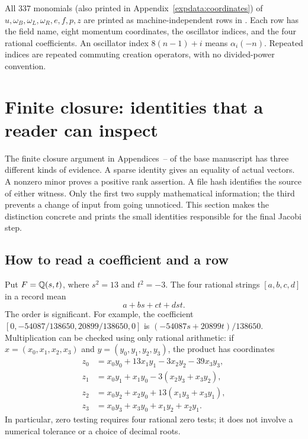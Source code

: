 All $337$ monomials (also printed in Appendix~\ref{expdata:coordinates}) of $u,\omega_B,\omega_L,\omega_R,e,f,p,z$ are
printed as machine-independent rows in
. Each row has
the field name, eight momentum coordinates, the oscillator indices,
and the four rational coefficients. An oscillator index $8(n-1)+i$
means $\alpha_i(-n)$. Repeated indices are repeated commuting creation
operators, with no divided-power convention.

\section{Finite closure: identities that a reader can inspect}
\label{sec:reader-finite}

The finite closure argument in Appendices~-- of the
base manuscript has three different kinds of
evidence.  A sparse identity gives an equality of actual vectors.  A
nonzero minor proves a positive rank assertion.  A file hash identifies
the source of either witness.  Only the first two supply mathematical
information; the third prevents a change of input from going unnoticed.
This section makes the distinction concrete and prints the small
identities responsible for the final Jacobi step.

\subsection{How to read a coefficient and a row}

Put $F=\mathbb Q(s,t)$, where $s^2=13$ and $t^2=-3$.  The four rational
strings $[a,b,c,d]$ in a record mean
\[
                  a+bs+ct+dst.
\]
The order is significant.  For example, the coefficient
$[0,-54087/138650,20899/138650,0]$ is
$(-54087s+20899t)/138650$.  Multiplication can be checked using
only rational arithmetic: if $x=(x_0,x_1,x_2,x_3)$ and
$y=(y_0,y_1,y_2,y_3)$, the product has coordinates
\begin{align*}
z_0&=x_0y_0+13x_1y_1-3x_2y_2-39x_3y_3,\\
z_1&=x_0y_1+x_1y_0-3(x_2y_3+x_3y_2),\\
z_2&=x_0y_2+x_2y_0+13(x_1y_3+x_3y_1),\\
z_3&=x_0y_3+x_3y_0+x_1y_2+x_2y_1.
\end{align*}
In particular, zero testing requires four rational zero tests; it
does not involve a numerical tolerance or a choice of decimal roots.

